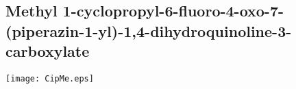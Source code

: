 

\subsection{Methyl 1\hyp{}cyclopropyl\hyp{}6\hyp{}fluoro\hyp{}4\hyp{}oxo\hyp{}7\hyp{}(piperazin\hyp{}1\hyp{}yl)\hyp{}1,4\hyp{}dihydroquinoline\hyp{}3\hyp{}carboxylate }


\begin{scheme}[H]
	\begin{center}
		\texttt{[image: CipMe.eps]}
	\end{center}
\end{scheme}

